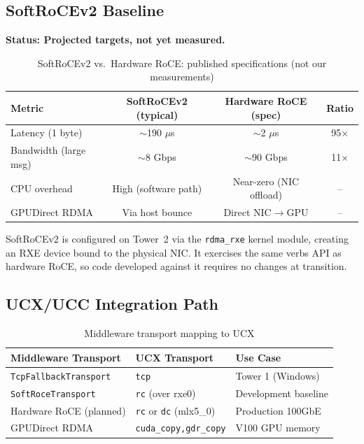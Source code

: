 \documentclass[11pt,letterpaper]{article}
\theoremstyle{definition}
\begin{document}
\subsection{SoftRoCEv2 Baseline}

\textbf{Status: Projected targets, not yet measured.}

\begin{table}[htbp]
\centering
\caption{SoftRoCEv2 vs.\ Hardware RoCE: published specifications (not our measurements)}
\label{tab:softroce-baseline}
\begin{tabular}{@{}lccc@{}}
\toprule
\textbf{Metric} & \textbf{SoftRoCEv2 (typical)} & \textbf{Hardware RoCE (spec)} & \textbf{Ratio} \\
\midrule
Latency (1 byte) & $\sim$190 $\mu$s & $\sim$2 $\mu$s & 95$\times$ \\
Bandwidth (large msg) & $\sim$8 Gbps & $\sim$90 Gbps & 11$\times$ \\
CPU overhead & High (software path) & Near-zero (NIC offload) & -- \\
GPUDirect RDMA & Via host bounce & Direct NIC$\to$GPU & -- \\
\bottomrule
\end{tabular}
\end{table}

SoftRoCEv2 is configured on Tower~2 via the \texttt{rdma\_rxe} kernel module, creating an RXE device bound to the physical NIC. It exercises the same verbs API as hardware RoCE, so code developed against it requires no changes at transition.

\subsection{UCX/UCC Integration Path}

\begin{table}[htbp]
\centering
\caption{Middleware transport mapping to UCX}
\label{tab:ucx-mapping}
\begin{tabular}{@{}lll@{}}
\toprule
\textbf{Middleware Transport} & \textbf{UCX Transport} & \textbf{Use Case} \\
\midrule
\texttt{TcpFallbackTransport} & \texttt{tcp} & Tower 1 (Windows) \\
\texttt{SoftRoceTransport} & \texttt{rc} (over rxe0) & Development baseline \\
Hardware RoCE (planned) & \texttt{rc} or \texttt{dc} (mlx5\_0) & Production 100GbE \\
GPUDirect RDMA & \texttt{cuda\_copy,gdr\_copy} & V100 GPU memory \\
\bottomrule
\end{tabular}
\end{table}
\end{document}

